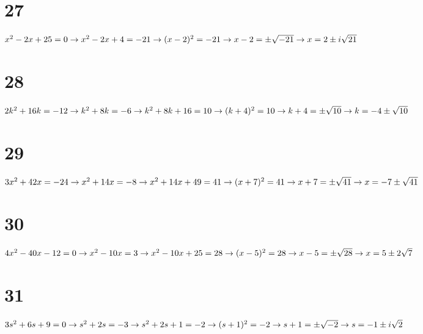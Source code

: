 \documentclass{article}
\theoremstyle{definition}
\begin{document}
\section*{27}
$x^2-2x+25=0\newline\rightarrow x^2-2x+4=-21\newline\rightarrow (x-2)^2=-21\newline\rightarrow x-2=\pm\sqrt{-21}\newline\rightarrow x=2\pm i\sqrt{21}$

\section*{28}
$2k^2+16k=-12\newline\rightarrow k^2+8k=-6\newline\rightarrow k^2+8k+16=10\newline\rightarrow (k+4)^2=10\newline\rightarrow k+4=\pm\sqrt{10}\newline
\rightarrow k=-4\pm\sqrt{10}$

\section*{29}
$3x^2+42x=-24\newline\rightarrow x^2+14x=-8\newline\rightarrow x^2+14x+49=41\newline\rightarrow (x+7)^2=41\newline\rightarrow x+7=\pm\sqrt{41}\newline
\rightarrow x=-7\pm\sqrt{41}$

\section*{30}
$4x^2-40x-12=0\newline\rightarrow x^2-10x=3\newline\rightarrow x^2-10x+25=28\newline\rightarrow (x-5)^2=28\newline\rightarrow x-5=\pm\sqrt{28}\newline
\rightarrow x=5\pm 2\sqrt{7}$

\section*{31}
$3s^2+6s+9=0\newline\rightarrow s^2+2s=-3\newline\rightarrow s^2+2s+1=-2\newline\rightarrow (s+1)^2=-2\newline\rightarrow s+1=\pm\sqrt{-2}\newline\rightarrow
s=-1\pm i\sqrt{2}$
\end{document}

